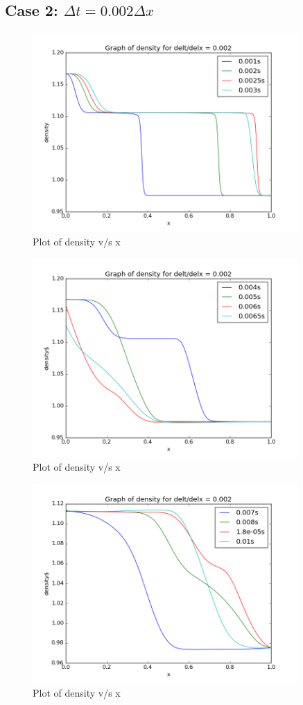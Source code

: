 \documentclass[11pt, a4paper]{article}
\begin{document}
\subsection{Case 2: $\Delta t = 0.002 \Delta x$}
\begin{figure}[H]
 \centering
 \includegraphics[width = 0.9\textwidth]{lax_fed_4_1.png}
 \caption{Plot of density v/s x}
\end{figure}
\begin{figure}[H]
 \centering
 \includegraphics[width = 0.9\textwidth]{lax_fed_4_2.png}
 \caption{Plot of density v/s x}
\end{figure}
\begin{figure}[H]
 \centering
 \includegraphics[width = 0.9\textwidth]{lax_fed_4_3.png}
 \caption{Plot of density v/s x}
\end{figure}
\end{document}
